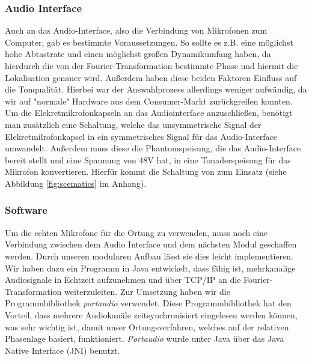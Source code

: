   \subsubsection{Audio Interface}
  Auch an das Audio-Interface, also die Verbindung von Mikrofonen zum Computer, gab es bestimmte Voraussetzungen. So sollte es z.B. eine möglichst hohe Abtastrate und einen möglichst großen Dynamikumfang haben, da hierdurch die von der Fourier-Transformation bestimmte Phase und hiermit die Lokalisation genauer wird\cite{sample}. Außerdem haben diese beiden Faktoren Einfluss auf die Tonqualität. Hierbei war der Auswahlprozess allerdings weniger aufwändig, da wir auf "normale" Hardware aus dem Consumer-Markt zurückgreifen konnten. Um die Elekretmikrofonkapseln an das Audiointerface anzuschließen, benötigt man zusätzlich eine Schaltung, welche das unsymmetrische Signal der Elekretmilrofonkapsel in ein symmetrisches Signal für das Audio-Interface umwandelt. Außerdem muss diese die Phantomspeisung, die das Audio-Interface bereit stellt und eine Spannung von 48V hat, in eine Tonaderspeisung für das Mikrofon konvertieren. Hierfür kommt die Schaltung von \cite{Powering_microphones} zum Einsatz (siehe Abbildung \ref{fig:scematics} im Anhang).

  \subsubsection{Software}
  Um die echten Mikrofone für die Ortung zu verwenden, muss noch eine Verbindung zwischen dem Audio Interface und dem nächsten Modul geschaffen werden. Durch unseren modularen Aufbau lässt sie dies leicht implementieren. Wir haben dazu ein Programm in Java entwickelt, dass fähig ist, mehrkanalige Audiosignale in Echtzeit aufzunehmen und über TCP/IP an die Fourier-Transformation weiterzuleiten. Zur Umsetzung haben wir die Programmbibliothek \textit{portaudio} \cite{portaudio} verwendet. Diese Programmbibliothek hat den Vorteil, dass mehrere Audiokanäle zeitsynchronisiert eingelesen werden können, was sehr wichtig ist, damit unser Ortungsverfahren, welches auf der relativen Phasenlage basiert, funktioniert. \textit{Portaudio} wurde unter Java über das Java Native Interface (JNI) benutzt.

